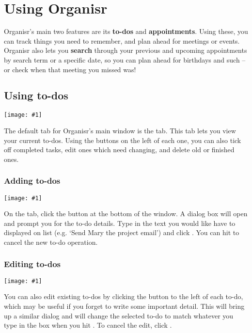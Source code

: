 \section{Using Organisr}

Organisr's main two features are its \textbf{to-dos} and \textbf{appointments}.
Using these, you can track things you need to remember, and plan ahead for
meetings or events. Organisr also lets you \textbf{search} through your previous
and upcoming appointments by search term or a specific date, so you can plan
ahead for birthdays and such -- or check when that meeting you missed was!


\subsection{Using to-dos}

\newcommand{\smallimg}[1]{\texttt{[image: \#1]}}
\newcommand{\halfimg}[1]{\texttt{[image: \#1]}}

\smallimg{01-todo-main}

The default tab for Organisr's main window is the  tab. This tab
lets you view your current to-dos. Using the buttons on the left of each one,
you can also tick off completed tasks, edit ones which need changing, and delete
old or finished ones.


\subsubsection{Adding to-dos}

\smallimg{02-todo-add}

On the  tab, click the  button at the bottom
of the window. A dialog box will open and prompt you for the to-do details. Type
in the text you would like have to displayed on list (e.g. `Send Mary the
project email') and click . You can hit  to cancel
the new to-do operation.


\subsubsection{Editing to-dos}

\smallimg{03-todo-edit}

You can also edit existing to-dos by clicking the  button to the left
of each to-do, which may be useful if you forget to write some important detail.
This will bring up a similar dialog and will change the selected to-do to match
whatever you type in the box when you hit . To cancel the edit,
click .


